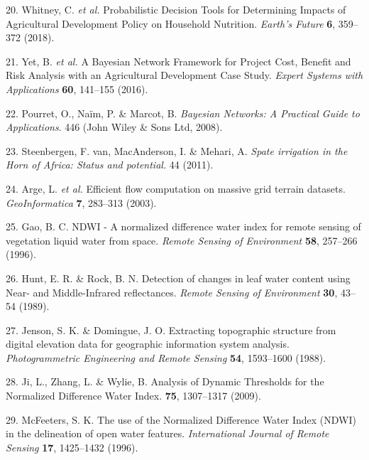\documentclass[12pt,oneside]{article}
\begin{document}
\leavevmode\hypertarget{ref-Whitney_et_al_2018a}{}%
20. Whitney, C. \emph{et al.} Probabilistic Decision Tools for Determining Impacts of Agricultural Development Policy on Household Nutrition. \emph{Earth's Future} \textbf{6}, 359--372 (2018).

\leavevmode\hypertarget{ref-Yet_et_al_2016}{}%
21. Yet, B. \emph{et al.} A Bayesian Network Framework for Project Cost, Benefit and Risk Analysis with an Agricultural Development Case Study. \emph{Expert Systems with Applications} \textbf{60}, 141--155 (2016).

\leavevmode\hypertarget{ref-Pourret_et_al_2008}{}%
22. Pourret, O., Naïm, P. \& Marcot, B. \emph{Bayesian Networks: A Practical Guide to Applications}. 446 (John Wiley \& Sons Ltd, 2008).

\leavevmode\hypertarget{ref-VanSteenbergen_et_al_2011}{}%
23. Steenbergen, F. van, MacAnderson, I. \& Mehari, A. \emph{Spate irrigation in the Horn of Africa: Status and potential.} 44 (2011).

\leavevmode\hypertarget{ref-Arge_et_al_2003}{}%
24. Arge, L. \emph{et al.} Efficient flow computation on massive grid terrain datasets. \emph{GeoInformatica} \textbf{7}, 283--313 (2003).

\leavevmode\hypertarget{ref-Gao_1996}{}%
25. Gao, B. C. NDWI - A normalized difference water index for remote sensing of vegetation liquid water from space. \emph{Remote Sensing of Environment} \textbf{58}, 257--266 (1996).

\leavevmode\hypertarget{ref-Hunt_and_Rock_1989}{}%
26. Hunt, E. R. \& Rock, B. N. Detection of changes in leaf water content using Near- and Middle-Infrared reflectances. \emph{Remote Sensing of Environment} \textbf{30}, 43--54 (1989).

\leavevmode\hypertarget{ref-Jenson_and_Domingue_1988}{}%
27. Jenson, S. K. \& Domingue, J. O. Extracting topographic structure from digital elevation data for geographic information system analysis. \emph{Photogrammetric Engineering and Remote Sensing} \textbf{54}, 1593--1600 (1988).

\leavevmode\hypertarget{ref-Ji_et_al_2009}{}%
28. Ji, L., Zhang, L. \& Wylie, B. Analysis of Dynamic Thresholds for the Normalized Difference Water Index. \textbf{75}, 1307--1317 (2009).

\leavevmode\hypertarget{ref-McFeeters_1996}{}%
29. McFeeters, S. K. The use of the Normalized Difference Water Index (NDWI) in the delineation of open water features. \emph{International Journal of Remote Sensing} \textbf{17}, 1425--1432 (1996).
\end{document}
